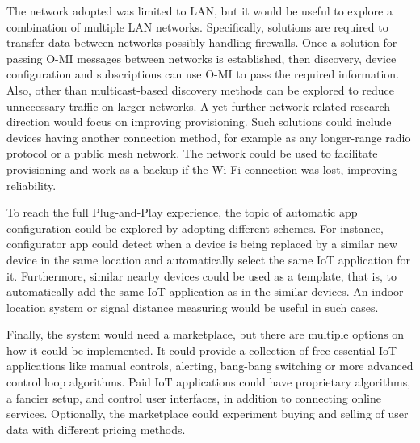 The network adopted was limited to LAN, but it would be useful to explore a combination of multiple LAN networks. Specifically, solutions are required to transfer data between networks possibly handling firewalls. Once a solution for passing O-MI messages between networks is established, then discovery, device configuration and subscriptions can use O-MI to pass the required information. Also, other than multicast-based discovery methods can be explored to reduce unnecessary traffic on larger networks. A yet further network-related research direction would focus on improving provisioning. Such solutions could include devices having another connection method, for example as any longer-range radio protocol or a public mesh network. The network could be used to facilitate provisioning and work as a backup if the Wi-Fi connection was lost, improving reliability.

To reach the full Plug-and-Play experience, the topic of automatic app configuration could be explored by adopting different schemes. For instance, configurator app could detect when a device is being replaced by a similar new device in the same location and automatically select the same IoT application for it. Furthermore, similar nearby devices could be used as a template, that is, to automatically add the same IoT application as in the similar devices. An indoor location system or signal distance measuring would be useful in such cases.

Finally, the system would need a marketplace, but there are multiple options on how it could be implemented. It could provide a collection of free essential IoT applications like manual controls, alerting, bang-bang switching or more advanced control loop algorithms. Paid IoT applications could have proprietary algorithms, a fancier setup, and control user interfaces, in addition to connecting online services. Optionally, the marketplace could experiment buying and selling of user data with different pricing methods.






